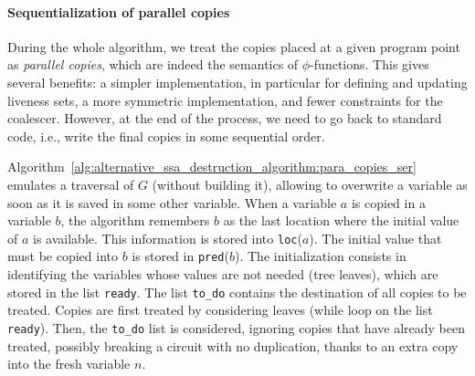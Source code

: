 \paragraph{Sequentialization of parallel copies}

                    
During the whole algorithm, we treat the copies placed at a given program point
as \emph{parallel copies}, which are indeed the semantics of $\phi$-functions.
This gives several benefits: a simpler implementation, in particular for
defining and updating liveness sets, a more symmetric implementation,
and fewer constraints for the coalescer. However, at the end of the process, we
need to go back to standard code, i.e., write the final copies in some
sequential order.

Algorithm~\ref{alg:alternative_ssa_destruction_algorithm:para_copies_ser} emulates a traversal of $G$ (without
building it), allowing to overwrite a variable as soon as it is saved in some
other variable.  When a variable $a$ is copied in a variable $b$, the algorithm
remembers $b$ as the last location where the initial value of $a$ is available.
This information is stored into \texttt{loc}($a$). The initial value that
must be copied into $b$ is stored in \texttt{pred}($b$). The initialization
consists in identifying the variables whose values are not needed (tree
leaves), which are stored in the list \texttt{ready}.  The list
\texttt{to\_do} contains the destination of all copies to be treated.  Copies
are first treated by considering leaves (while loop on the list
\texttt{ready}). Then, the \texttt{to\_do} list is considered, ignoring
copies that have already been treated, possibly breaking a circuit with no
duplication, thanks to an extra copy into the fresh variable $n$.

